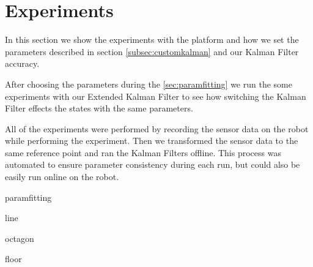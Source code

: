 \documentclass[class=report, crop=false]{standalone}
\begin{document}
\chapter{Experiments}

In this section we show the experiments with the platform and how we set the parameters described in section \ref{subsec:customkalman} and our Kalman Filter accuracy.

After choosing the parameters during the \ref{sec:paramfitting} we run the some experiments with our Extended Kalman Filter to see how switching the Kalman Filter effects the states with the same parameters.

All of the experiments were performed by recording the sensor data on the robot while performing the experiment. Then we transformed the sensor data to the same reference point and ran the Kalman Filters offline. This process was automated to ensure parameter consistency during each run, but could also be easily run online on the robot.

{paramfitting}

{line}

{octagon}

{floor}
\end{document}
